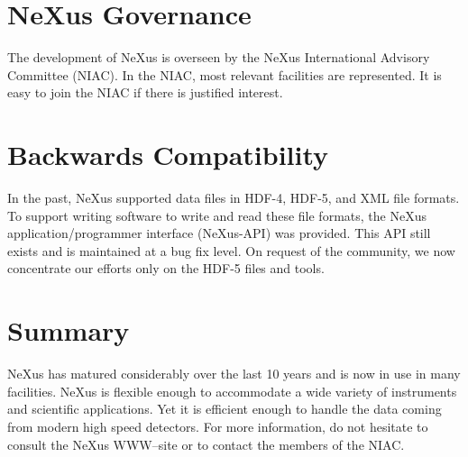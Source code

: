 \documentclass[%
 aip,
rsi,
 amsmath,amssymb,
 reprint,%
]{revtex4-1}
\begin{document}
\section{NeXus Governance}

The development of NeXus is overseen by the NeXus International Advisory Committee (NIAC). 
In the NIAC, most relevant facilities are represented. It is easy to join the NIAC if 
there is justified interest. 

\section{Backwards Compatibility}

In the past, NeXus supported data files in HDF-4, HDF-5, and XML file formats. 
To support writing software to write and read these file formats, the NeXus
application/programmer interface (NeXus-API) was provided.
This API still exists and is maintained at a bug fix level.
On request of the community, we now concentrate our efforts only
on the HDF-5 files and tools.

\section{Summary}

NeXus has matured considerably over the last 10 years and is now in use in many facilities. NeXus 
is flexible enough to accommodate a wide variety of instruments and scientific applications. 
Yet it is efficient enough to 
handle the data coming from modern high speed detectors. For more information,
do not hesitate to consult the NeXus WWW--site\cite{nxwww} or to contact
the members of the NIAC. 



\nocite{*}
\end{document}
